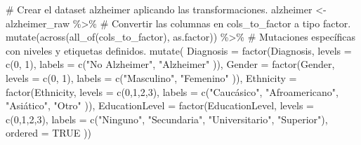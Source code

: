 \documentclass[
  letterpaper,
  DIV=11,
  numbers=noendperiod]{scrartcl}
\newenvironment{Shaded}{\begin{snugshade}}{\end{snugshade}}
\newcommand{\AttributeTok}[1]{\textcolor[rgb]{0.40,0.45,0.13}{#1}}
\newcommand{\CommentTok}[1]{\textcolor[rgb]{0.37,0.37,0.37}{#1}}
\newcommand{\ConstantTok}[1]{\textcolor[rgb]{0.56,0.35,0.01}{#1}}
\newcommand{\DecValTok}[1]{\textcolor[rgb]{0.68,0.00,0.00}{#1}}
\newcommand{\FunctionTok}[1]{\textcolor[rgb]{0.28,0.35,0.67}{#1}}
\newcommand{\NormalTok}[1]{\textcolor[rgb]{0.00,0.23,0.31}{#1}}
\newcommand{\OtherTok}[1]{\textcolor[rgb]{0.00,0.23,0.31}{#1}}
\newcommand{\SpecialCharTok}[1]{\textcolor[rgb]{0.37,0.37,0.37}{#1}}
\newcommand{\StringTok}[1]{\textcolor[rgb]{0.13,0.47,0.30}{#1}}
\begin{document}
\begin{Shaded}
\begin{Highlighting}[]
\CommentTok{\# Crear el dataset \textquotesingle{}alzheimer\textquotesingle{} aplicando las transformaciones.}
\NormalTok{alzheimer }\OtherTok{\textless{}{-}}\NormalTok{ alzheimer\_raw }\SpecialCharTok{\%\textgreater{}\%}
  \CommentTok{\# Convertir las columnas en \textquotesingle{}cols\_to\_factor\textquotesingle{} a tipo factor.}
  \FunctionTok{mutate}\NormalTok{(}\FunctionTok{across}\NormalTok{(}\FunctionTok{all\_of}\NormalTok{(cols\_to\_factor), as.factor)) }\SpecialCharTok{\%\textgreater{}\%}
  \CommentTok{\# Mutaciones específicas con niveles y etiquetas definidos.}
  \FunctionTok{mutate}\NormalTok{(}
    \AttributeTok{Diagnosis =} \FunctionTok{factor}\NormalTok{(Diagnosis, }
                       \AttributeTok{levels =} \FunctionTok{c}\NormalTok{(}\DecValTok{0}\NormalTok{, }\DecValTok{1}\NormalTok{),}
                       \AttributeTok{labels =} \FunctionTok{c}\NormalTok{(}\StringTok{"No Alzheimer"}\NormalTok{,}
                                  \StringTok{"Alzheimer"}
\NormalTok{                       )),}
    \AttributeTok{Gender =} \FunctionTok{factor}\NormalTok{(Gender,}
                    \AttributeTok{levels =} \FunctionTok{c}\NormalTok{(}\DecValTok{0}\NormalTok{, }\DecValTok{1}\NormalTok{),}
                    \AttributeTok{labels =} \FunctionTok{c}\NormalTok{(}\StringTok{"Masculino"}\NormalTok{,}
                               \StringTok{"Femenino"}
\NormalTok{                       )),}
    \AttributeTok{Ethnicity =} \FunctionTok{factor}\NormalTok{(Ethnicity, }
                       \AttributeTok{levels =} \FunctionTok{c}\NormalTok{(}\DecValTok{0}\NormalTok{,}\DecValTok{1}\NormalTok{,}\DecValTok{2}\NormalTok{,}\DecValTok{3}\NormalTok{),}
                       \AttributeTok{labels =} \FunctionTok{c}\NormalTok{(}\StringTok{"Caucásico"}\NormalTok{, }
                                  \StringTok{"Afroamericano"}\NormalTok{, }
                                  \StringTok{"Asiático"}\NormalTok{, }
                                  \StringTok{"Otro"}
\NormalTok{                       )),}
    \AttributeTok{EducationLevel =} \FunctionTok{factor}\NormalTok{(EducationLevel,}
                            \AttributeTok{levels =} \FunctionTok{c}\NormalTok{(}\DecValTok{0}\NormalTok{,}\DecValTok{1}\NormalTok{,}\DecValTok{2}\NormalTok{,}\DecValTok{3}\NormalTok{),}
                            \AttributeTok{labels =} \FunctionTok{c}\NormalTok{(}\StringTok{"Ninguno"}\NormalTok{,}
                                       \StringTok{"Secundaria"}\NormalTok{,}
                                       \StringTok{"Universitario"}\NormalTok{,}
                                       \StringTok{"Superior"}\NormalTok{),}
                            \AttributeTok{ordered =} \ConstantTok{TRUE}
\NormalTok{                       ))}


\end{Highlighting}
\end{Shaded}
\end{document}
